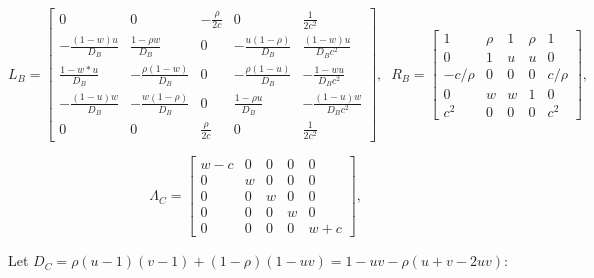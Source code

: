 \documentclass{article}
\begin{document}
\begin{equation}
L_B = \left[
    \begin{array}{ccccc}
      0                  & 0 & -\frac{\rho}{2c}  & 0              & \frac{1}{2c^2}\\
      -\frac{(1-w) u}{D_B} & \frac{1-\rho w}{D_B} & 0 & -\frac{u (1-\rho)}{D_B} &  \frac{(1-w)u}{D_B c^2}\\
       \frac{1-w*u}{D_B} &  -\frac{\rho (1-w)}{D_B}  & 0 & -\frac{\rho (1-u)}{D_B} & -\frac{1 -w u}{D_B c^2}\\
      -\frac{(1-u)w}{D_B} & -\frac{w (1-\rho)}{D_B} & 0 & \frac{1-\rho u}{D_B} & -\frac{(1 - u) w}{D_B c^2} \\
      0 & 0 & \frac{\rho}{2c}  & 0               & \frac{1}{2c^2}
    \end{array}
  \right],\;\;
  R_B = \left[
    \begin{array}{ccccc}
      1       & \rho & 1 & \rho & 1 \\
      0       & 1 & u    & u    & 0 \\
      -c/\rho & 0 & 0    & 0    & c/\rho \\
      0       & w & w    & 1    & 0 \\
      c^2     & 0 & 0    & 0    & c^2
    \end{array}
  \right],\;\;
\end{equation}

\begin{equation}
  \Lambda_C = \left[
    \begin{array}{ccccc}
      w-c& 0 & 0 & 0 & 0\\
      0  & w & 0 & 0 & 0\\
      0  & 0 & w & 0 & 0\\
      0  & 0 & 0 & w & 0\\
      0  & 0 & 0 & 0 & w+c
    \end{array}
  \right],\;\;
\end{equation}

Let $D_C=\rho (u-1) (v-1) + (1-\rho) (1-uv) = 1-uv -\rho(u+v-2uv)$:
\end{document}
